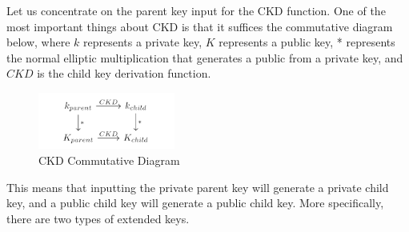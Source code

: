 \documentclass{article}
\begin{document}
    Let us concentrate on the parent key input for the CKD function. One of the most important things about CKD is that it suffices the commutative diagram below, where $k$ represents a private key, $K$ represents a public key, * represents the normal elliptic multiplication that generates a public from a private key, and $CKD$ is the child key derivation function.

    \begin{figure}[H]
    \centering
    \includegraphics[width=0.4\textwidth]{img/CKD_Commutative_Diagram.png}
    \caption{CKD Commutative Diagram}
    \end{figure}

    This means that inputting the private parent key will generate a private child key, and a public child key will generate a public child key. More specifically, there are two types of extended keys.
\end{document}
